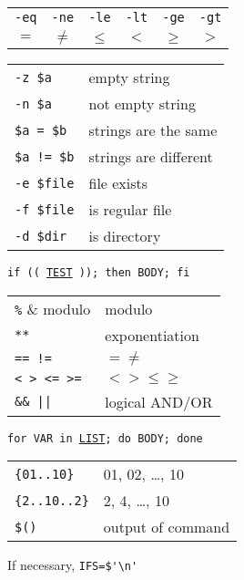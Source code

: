 \documentclass[a4paper, twocolumn]{article}
\renewcommand{\tt}{\texttt}
\begin{document}
\begin{tabular}{cccccc}
    \verb|-eq| & \verb|-ne| & \verb|-le| & \verb|-lt| & \verb|-ge| & \verb|-gt| \\
    $=$        & $\neq$     & $\leq$     & $<$        & $\geq$     & $>$
\end{tabular}
\vspace{0.3cm}

\begin{tabular}{ll}
    \verb|-z $a|        & empty string                              \\
    \verb|-n $a|        & not empty string                          \\
    \verb|$a = $b|      & strings are the same                      \\
    \verb|$a != $b|     & strings are different                     \\
    \verb|-e $file|     & file exists                               \\
    \verb|-f $file|     & is regular file                           \\
    \verb|-d $dir|      & is directory
\end{tabular}
\vspace{0.5cm}

\tt{if (( \underline{TEST} )); then BODY; fi}
\vspace{0.3cm}

\begin{tabular}{ll}
    \verb|%|            & modulo                                    \\
    \verb|**|           & exponentiation                            \\
    \verb|== !=|        & $= \neq$                                  \\
    \verb|< > <= >=|    & $< > \leq \geq$                           \\
    \verb!&& ||!        & logical AND/OR
\end{tabular}
\vspace{0.5cm}

\tt{for VAR in \underline{LIST}; do BODY; done}
\vspace{0.3cm}

\begin{tabular}{ll}
    \verb|{01..10}|     & 01, 02, …, 10                             \\
    \verb|{2..10..2}|   & 2, 4, …, 10                               \\
    \verb|$()|          & output of command
\end{tabular}
\vspace{0.3cm}

If necessary, \verb|IFS=$'\n'|
\end{document}
